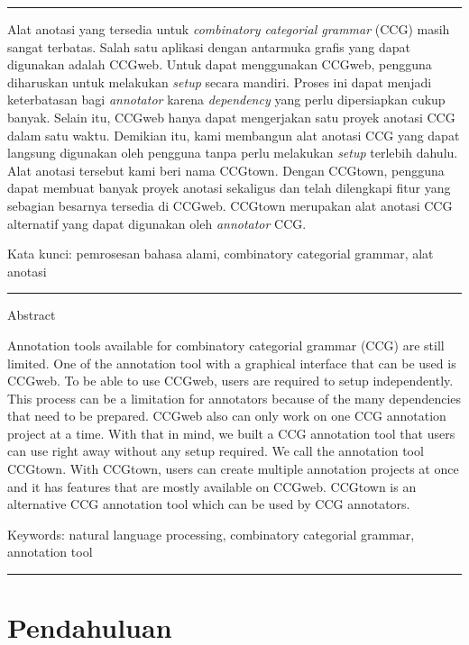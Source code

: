 {\bf \parindent0pt \noindent\rule{\textwidth}{1pt}
Alat anotasi yang tersedia untuk \textit{combinatory categorial grammar} (CCG) masih sangat terbatas.
Salah satu aplikasi dengan antarmuka grafis yang dapat digunakan adalah CCGweb. Untuk dapat
menggunakan CCGweb, pengguna diharuskan untuk melakukan \textit{setup} secara mandiri. Proses ini
dapat menjadi keterbatasan bagi \textit{annotator} karena \textit{dependency} yang perlu
dipersiapkan cukup banyak. Selain itu, CCGweb hanya dapat mengerjakan satu proyek anotasi CCG
dalam satu waktu. Demikian itu, kami membangun alat anotasi CCG yang dapat langsung digunakan
oleh pengguna tanpa perlu melakukan \textit{setup} terlebih dahulu. Alat anotasi tersebut kami
beri nama CCGtown. Dengan CCGtown, pengguna dapat membuat banyak proyek anotasi sekaligus dan
telah dilengkapi fitur yang sebagian besarnya tersedia di CCGweb. CCGtown merupakan alat anotasi
CCG alternatif yang dapat digunakan oleh \textit{annotator} CCG.


\bigskip
Kata kunci: pemrosesan bahasa alami, combinatory categorial grammar, alat anotasi






\noindent\rule{\textwidth}{1pt}
Abstract

Annotation tools available for combinatory categorial grammar (CCG) are still limited.
One of the annotation tool with a graphical interface that can be used is CCGweb.
To be able to use CCGweb, users are required to setup independently.
This process can be a limitation for annotators because of the many dependencies that
need to be prepared.
CCGweb also can only work on one CCG annotation project at a time.
With that in mind, we built a CCG annotation tool that users can use right away without
any setup required.
We call the annotation tool CCGtown.
With CCGtown, users can create multiple annotation projects at once and it has features
that are mostly available on CCGweb.
CCGtown is an alternative CCG annotation tool which can be used by CCG annotators.


\bigskip
Keywords: natural language processing, combinatory categorial grammar, annotation tool

\noindent\rule{\textwidth}{1pt} }
   



\section{Pendahuluan}

